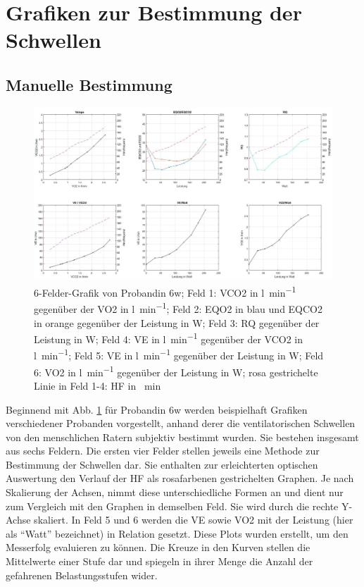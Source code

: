 \section{Grafiken zur Bestimmung der Schwellen}
%
\subsection{Manuelle Bestimmung}
%
\begin{figure}[H]
	\centering
	\includegraphics[width=\textwidth]{Bilder/plot_6w.jpg}
	\caption[6-Felder-Grafik von Probandin 6w]{6-Felder-Grafik von Probandin 6w; Feld 1: \gls{VCO2} in \si{\litre\per\minute} gegenüber der \gls{VO2} in \si{\litre\per\minute}; Feld 2: \gls{EQO2} in blau und \gls{EQCO2} in orange gegenüber der Leistung in \si{\watt}; Feld 3: \gls{RQ} gegenüber der Leistung in \si{\watt}; Feld 4: \gls{VE} in \si{\litre\per\minute} gegenüber der \gls{VCO2} in \si{\litre\per\minute}; Feld 5: \gls{VE} in \si{\litre\per\minute} gegenüber der Leistung in \si{\watt}; Feld 6: \gls{VO2} in \si{\litre\per\minute} gegenüber der Leistung in \si{\watt}; rosa gestrichelte Linie in Feld 1-4: \gls{HF} in \si{\per\minute}}
	\label{pic:pic15}
\end{figure}
%
Beginnend mit Abb. \ref{pic:pic15} für Probandin 6w werden beispielhaft Grafiken verschiedener Probanden vorgestellt, anhand derer die ventilatorischen Schwellen von den menschlichen Ratern subjektiv bestimmt wurden. Sie bestehen insgesamt aus sechs Feldern. Die ersten vier Felder stellen jeweils eine Methode zur Bestimmung der Schwellen dar. Sie enthalten zur erleichterten optischen Auswertung den Verlauf der \gls{HF} als rosafarbenen gestrichelten Graphen. Je nach Skalierung der Achsen, nimmt diese unterschiedliche Formen an und dient nur zum Vergleich mit den Graphen in demselben Feld. Sie wird durch die rechte Y-Achse skaliert. In Feld 5 und 6 werden die \gls{VE} sowie \gls{VO2} mit der Leistung (hier als "`Watt"' bezeichnet) in Relation gesetzt. Diese Plots wurden erstellt, um den Messerfolg evaluieren zu können. Die Kreuze in den Kurven stellen die Mittelwerte einer Stufe dar und spiegeln in ihrer Menge die Anzahl der gefahrenen Belastungsstufen wider.
